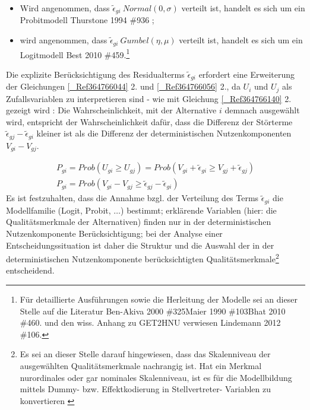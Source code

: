 \begin{itemize}
%
   \item Wird angenommen, dass ${{\widetilde{{\epsilon }}}_{gi}}~Normal\left({0,\sigma }\right)$ verteilt ist, handelt es sich um ein Probitmodell {Thurstone 1994 \#936} \autocites[][]{bib.325}; 
   \item wird angenommen, dass ${{\widetilde{{\epsilon }}}_{gi}}~Gumbel\left({\eta ,\mu }\right)$ verteilt ist, handelt es sich um ein Logitmodell  \autocites[][]{bib.934} \autocites[][]{bib.325}{Best 2010 \#459}.\footnote{%
 Für detaillierte Ausführungen sowie die Herleitung der Modelle sei an dieser Stelle auf die Literatur {Ben-Akiva 2000 \#325}{Maier 1990 \#103}{Bhat 2010 \#460}. und den wiss. Anhang zu GET2HNU verwiesen {Lindemann 2012 \#106}.
}%

%
\end{itemize}
Die explizite Berücksichtigung des Residualterms ${{\widetilde{{\epsilon }}}_{gi}}$ erfordert eine Erweiterung der Gleichungen \autoref{_Ref364766044} 2. und \autoref{_Ref364766056} 2., da ${{U}_{i}}$ und ${{U}_{j}}$ als Zufallsvariablen zu interpretieren sind -  wie mit Gleichung \autoref{_Ref364766140} 2. gezeigt wird  \autocites[][]{bib.935} \autocites[][]{bib.325} \autocites[][]{bib.103}: Die Wahrscheinlichkeit, mit der Alternative $i$ demnach ausgewählt wird, entspricht der Wahrscheinlichkeit dafür, dass die Differenz der Störterme ${{\widetilde{{\epsilon }}}_{gj}}-{{\widetilde{{\epsilon }}}_{gi}}$ kleiner ist als die Differenz der deterministischen Nutzenkomponenten ${{V}_{gi}}-{{V}_{gj}}$.
 
\begin{align}
{{P}_{gi}}=Prob\left({{{U}_{gi}}\geq {{U}_{gj}}}\right) =Prob\left({{{V}_{gi}}+{{\widetilde{{\epsilon }}}_{gi}}\geq {{V}_{gj}}+{{\widetilde{{\epsilon }}}_{gj}}}\right) \\ 
{{P}_{gi}}=Prob\left({{{V}_{gi}}-{{V}_{gj}}\geq {{\widetilde{{\epsilon }}}_{gj}}-{{\widetilde{{\epsilon }}}_{gi}}}\right)
\label{_Ref364766140}
\end{align} 
Es ist festzuhalten, dass die Annahme bzgl. der Verteilung des Terms ${{\widetilde{{\epsilon }}}_{gi}}$ die Modellfamilie (Logit, Probit, $\ldots$) bestimmt; erklärende Variablen (hier: die Qualitätsmerkmale der Alternativen) finden nur in der deterministischen Nutzenkomponente Berücksichtigung; bei der Analyse einer Entscheidungssituation ist daher die Struktur und die Auswahl der in der deterministischen Nutzenkomponente berücksichtigten Qualitätsmerkmale\footnote{%
 Es sei an dieser Stelle darauf hingewiesen, dass das Skalenniveau der ausgewählten Qualitätsmerkmale nachrangig ist. Hat ein Merkmal \glqq nur\grqq  ordinales oder gar nominales Skalenniveau, ist es für die Modellbildung mittels Dummy- bzw. Effektkodierung in Stellvertreter- Variablen zu konvertieren  \autocites[][]{bib.242} \autocites[][]{bib.281} \autocites[][]{bib.269} \autocites[][]{bib.931} \autocites[][]{bib.929}
}%
 entscheidend.~\\


